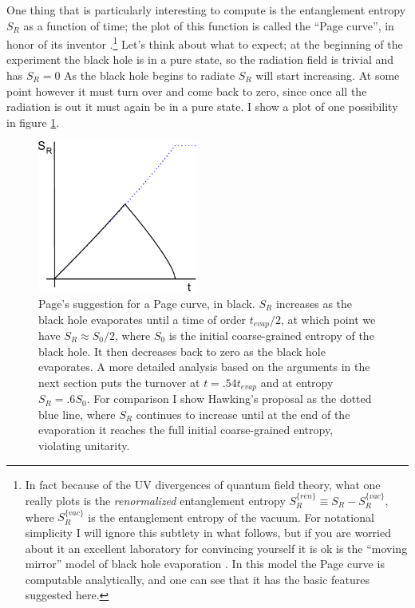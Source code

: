 \documentclass[12pt]{article}
\begin{document}
One thing that is particularly interesting to compute is the entanglement entropy $S_R$ as a function of time; the plot of this function is called the ``Page curve'', in honor of its inventor \cite{Page:1993wv,Page:2013dx}.\footnote{In fact because of the UV divergences of quantum field theory, what one really plots is the \textit{renormalized} entanglement entropy $S_{R}^{\{ren\}}\equiv S_R-S_R^{\{vac\}}$, where $S_R^{\{vac\}}$ is the entanglement entropy of the vacuum.  For notational simplicity I will ignore this subtlety in what follows, but if you are worried about it an excellent laboratory for convincing yourself it is ok is the ``moving mirror'' model of black hole evaporation \cite{Holzhey:1994we}.  In this model the Page curve is computable analytically, and one can see that it has the basic features suggested here.}  Let's think about what to expect; at the beginning of the experiment the black hole is in a pure state, so the radiation field is trivial and has $S_R=0$  As the black hole begins to radiate $S_R$ will start increasing. At some point however it must turn over and come back to zero, since once all the radiation is out it must again be in a pure state.  I show a plot of one possibility in figure \ref{pagecurve}.
\begin{figure}
\begin{center}
\includegraphics[height=5cm]{pagecurve.pdf}
\caption{Page's suggestion for a Page curve, in black.  $S_R$ increases as the black hole evaporates until a time of order $t_{\mathit{evap}}/2$, at which point we have $S_R\approx S_0/2$, where $S_0$ is the initial coarse-grained entropy of the black hole.  It then decreases back to zero as the black hole evaporates.  A more detailed analysis \cite{Page:2013dx} based on the arguments  in the next section puts the turnover at $t=.54 t_{\mathit{evap}}$ and at entropy $S_R=.6 S_0$.  For comparison I show Hawking's proposal as the dotted blue line, where $S_R$ continues to increase until at the end of the evaporation it reaches the full initial coarse-grained entropy, violating unitarity.}\label{pagecurve}
\end{center}
\end{figure}
\end{document}
